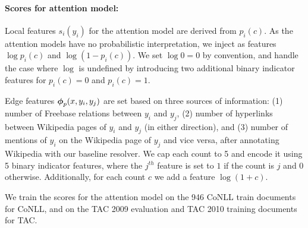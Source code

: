 \paragraph*{Scores for attention model:}
{Local features} $s_i(y_i)$ for the attention model are derived
from $p_i(c)$.  As the attention models have no probabilistic
interpretation, we inject as features
$\log p_i(c)$ and $\log(1-p_i(c))$. We set $\log0=0$ by convention,
and handle the case where $\log$ is undefined by introducing two additional
binary indicator features for $p_i(c)=0$ and $p_i(c)=1$.

{Edge features} $\boldsymbol{\phi}_p(x,y_i,y_j)$ are set based on three sources of information: (1) number of Freebase relations between $y_i$ and $y_j$, (2) number of hyperlinks between Wikipedia pages of $y_i$ and $y_j$ (in either direction), and
(3) number of mentions of $y_i$ on the Wikipedia page of $y_j$ and vice versa, after
annotating  Wikipedia with our baseline resolver. 
We cap each count to 5 and encode it using 5 binary indicator features,
where the $j^{th}$ feature is set to $1$ if the count is $j$ and $0$ otherwise. Additionally, 
for each count $c$ we add a feature $\log{\left(1+c\right)}$.

We train the scores for the attention model on the 946 CoNLL train documents for CoNLL, and on the TAC 2009 evaluation and TAC 2010 training documents for TAC.  

